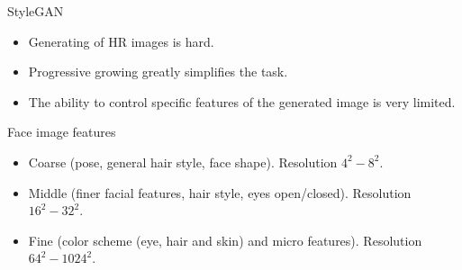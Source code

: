 \begin{frame}{StyleGAN}
	\begin{itemize}
		\item Generating of HR images is hard.
		\item Progressive growing greatly simplifies the task.
		\item The ability to control specific features of the generated image is very limited.
	\end{itemize}
	\begin{block}{Face image features}
		\begin{itemize}
			\item Coarse (pose, general hair style, face shape). Resolution $4^2 - 8^2$.
			\item Middle (finer facial features, hair style, eyes open/closed). Resolution $16^2 - 32^2$.
			\item Fine (color scheme (eye, hair and skin) and micro features). Resolution $64^2 - 1024^2$.
		\end{itemize}
	\end{block}
\end{frame}
